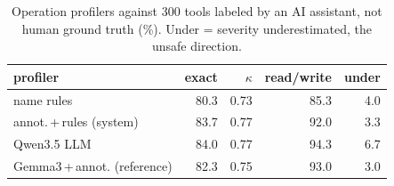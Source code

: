\begin{table}[t]\centering\caption{Operation profilers against 300 tools labeled by an AI assistant, not human ground truth (\%). Under = severity underestimated, the unsafe direction.}\label{tab:profiles}
\footnotesize\setlength{\tabcolsep}{3pt}\begin{tabular}{lrrrr}\toprule
profiler & exact & $\kappa$ & read/write & under\\\midrule
name rules & 80.3 & 0.73 & 85.3 & 4.0\\
annot.\,+\,rules (system) & 83.7 & 0.77 & 92.0 & 3.3\\
Qwen3.5 LLM & 84.0 & 0.77 & 94.3 & 6.7\\
Gemma3\,+\,annot. (reference) & 82.3 & 0.75 & 93.0 & 3.0\\
\bottomrule\end{tabular}\end{table}
